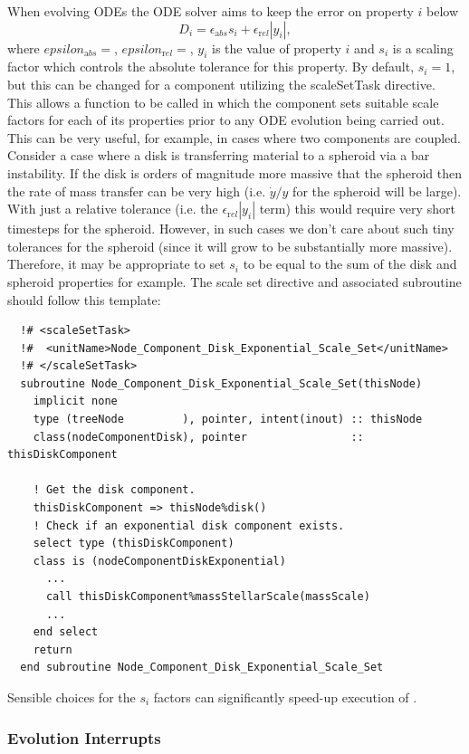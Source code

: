 When evolving ODEs the ODE solver aims to keep the error on property $i$ below
\begin{equation}
 D_i = \epsilon_{\mathrm abs} s_i + \epsilon_{\mathrm rel} |y_i|,
\end{equation}
where $epsilon_{\mathrm abs}=${\normalfont \ttfamily [odeToleranceAbsolute]}, $epsilon_{\mathrm rel}=${\normalfont \ttfamily [odeToleranceRelative]}, $y_i$ is the value of property $i$ and $s_i$ is a scaling factor which controls the absolute tolerance for this property. By default, $s_i=1$, but this can be changed for a component utilizing the {\normalfont \ttfamily scaleSetTask} directive. This allows a function to be called in which the component sets suitable scale factors for each of its properties prior to any ODE evolution being carried out. This can be very useful, for example, in cases where two components are coupled. Consider a case where a disk is transferring material to a spheroid via a bar instability. If the disk is orders of magnitude more massive that the spheroid then the rate of mass transfer can be very high (i.e. $\dot{y}/y$ for the spheroid will be large). With just a relative tolerance (i.e. the $\epsilon_{\mathrm rel} |y_i|$ term) this would require very short timesteps for the spheroid. However, in such cases we don't care about such tiny tolerances for the spheroid (since it will grow to be substantially more massive). Therefore, it may be appropriate to set $s_i$ to be equal to the sum of the disk and spheroid properties for example. The scale set directive and associated subroutine should follow this template:
\begin{verbatim}
  !# <scaleSetTask>
  !#  <unitName>Node_Component_Disk_Exponential_Scale_Set</unitName>
  !# </scaleSetTask>
  subroutine Node_Component_Disk_Exponential_Scale_Set(thisNode)
    implicit none
    type (treeNode         ), pointer, intent(inout) :: thisNode
    class(nodeComponentDisk), pointer                :: thisDiskComponent

    ! Get the disk component.
    thisDiskComponent => thisNode%disk()
    ! Check if an exponential disk component exists.
    select type (thisDiskComponent)
    class is (nodeComponentDiskExponential)
      ...
      call thisDiskComponent%massStellarScale(massScale)
      ...
    end select
    return
  end subroutine Node_Component_Disk_Exponential_Scale_Set
\end{verbatim}
Sensible choices for the $s_i$ factors can significantly speed-up execution of \glc.

\subsubsection{Evolution Interrupts}

